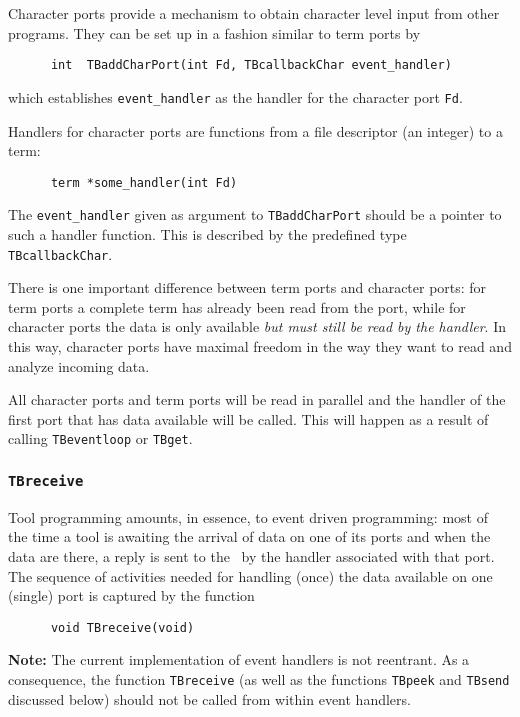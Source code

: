 Character ports provide a mechanism to obtain character level input
from other programs. They can be set up in a fashion similar 
to term ports by
\begin{verbatim}
      int  TBaddCharPort(int Fd, TBcallbackChar event_handler)
\end{verbatim}
which establishes {\tt event\_handler} as the handler for the character port {\tt Fd}.

Handlers for character ports are functions from a file descriptor (an integer)
to a term:
\begin{verbatim}
      term *some_handler(int Fd)
\end{verbatim}
The {\tt event\_handler} given as argument to
{\tt TBaddCharPort} should be a pointer to such a handler function.
This is described by the predefined type {\tt TBcallbackChar}.

There is one important difference between term ports and character ports:
for term ports a complete term has already been read from the port,
while for character ports the data is only available {\em but must still
be read by the handler}. In this way, character ports have maximal
freedom in the way they want to read and analyze incoming data.

All character ports and term ports will be read in parallel
and the handler of the first port that has data available will be called.
This will happen as a result of calling {\tt TBeventloop} or {\tt TBget}.

\subsubsection{\label{TBreceive}{\tt TBreceive}}

Tool programming amounts, in essence, to event driven programming: most of the time
a tool is awaiting the arrival of data on one of its
ports and when the data are there, a reply is sent to the \TB\ by the
handler associated with that port.  The sequence of activities needed for
handling (once) the data available on one (single) port is captured by the function
\begin{verbatim}
      void TBreceive(void)
\end{verbatim}

{\bf Note:} The current implementation of event handlers is not reentrant.
As a consequence, the function {\tt TBreceive} (as well as the
functions {\tt TBpeek} and {\tt TBsend} discussed below)
should not be called from within event handlers.

